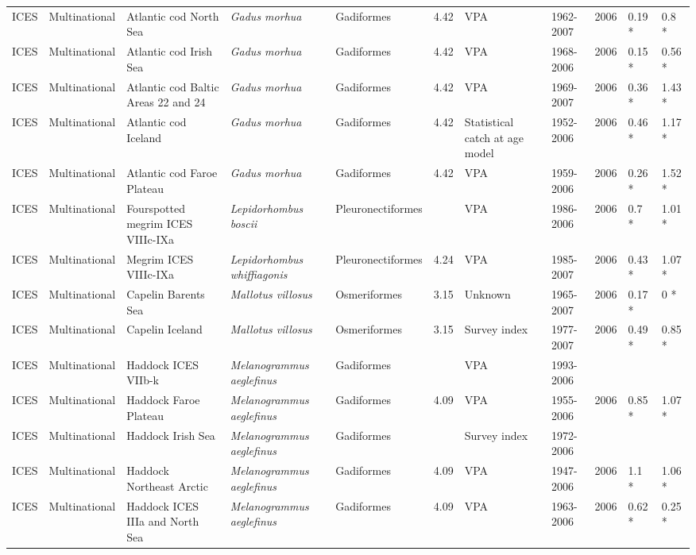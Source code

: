 \begin{longtable}{p{1.5cm}p{1.5cm}p{3cm}p{3cm}p{2.5cm}p{0.9cm}p{1.4cm}p{0.9cm}p{0.9cm}p{0.9cm}p{1cm}}
  ICES & Multinational & Atlantic cod North Sea & \textit{Gadus morhua} & Gadiformes & 4.42 & VPA & 1962-2007 & 2006 & 0.19 * & 0.8 * \\ 
  ICES & Multinational & Atlantic cod Irish Sea & \textit{Gadus morhua} & Gadiformes & 4.42 & VPA & 1968-2006 & 2006 & 0.15 * & 0.56 * \\ 
  ICES & Multinational & Atlantic cod Baltic Areas 22 and 24 & \textit{Gadus morhua} & Gadiformes & 4.42 & VPA & 1969-2007 & 2006 & 0.36 * & 1.43 * \\ 
  ICES & Multinational & Atlantic cod Iceland & \textit{Gadus morhua} & Gadiformes & 4.42 & Statistical catch at age model & 1952-2006 & 2006 & 0.46 * & 1.17 * \\ 
  ICES & Multinational & Atlantic cod Faroe Plateau & \textit{Gadus morhua} & Gadiformes & 4.42 & VPA & 1959-2006 & 2006 & 0.26 * & 1.52 * \\ 
  ICES & Multinational & Fourspotted megrim ICES VIIIc-IXa & \textit{Lepidorhombus boscii} & Pleuronectiformes &  & VPA & 1986-2006 & 2006 & 0.7 * & 1.01 * \\ 
  ICES & Multinational & Megrim ICES VIIIc-IXa & \textit{Lepidorhombus whiffiagonis} & Pleuronectiformes & 4.24 & VPA & 1985-2007 & 2006 & 0.43 * & 1.07 * \\ 
  ICES & Multinational & Capelin Barents Sea & \textit{Mallotus villosus} & Osmeriformes & 3.15 & Unknown & 1965-2007 & 2006 & 0.17 * & 0 * \\ 
  ICES & Multinational & Capelin Iceland & \textit{Mallotus villosus} & Osmeriformes & 3.15 & Survey index & 1977-2007 & 2006 & 0.49 * & 0.85 * \\ 
  ICES & Multinational & Haddock ICES VIIb-k & \textit{Melanogrammus aeglefinus} & Gadiformes &  & VPA & 1993-2006 &  &  &  \\ 
  ICES & Multinational & Haddock Faroe Plateau & \textit{Melanogrammus aeglefinus} & Gadiformes & 4.09 & VPA & 1955-2006 & 2006 & 0.85 * & 1.07 * \\ 
  ICES & Multinational & Haddock Irish Sea & \textit{Melanogrammus aeglefinus} & Gadiformes &  & Survey index & 1972-2006 &  &  &  \\ 
  ICES & Multinational & Haddock Northeast Arctic & \textit{Melanogrammus aeglefinus} & Gadiformes & 4.09 & VPA & 1947-2006 & 2006 & 1.1 * & 1.06 * \\ 
  ICES & Multinational & Haddock ICES IIIa and North Sea & \textit{Melanogrammus aeglefinus} & Gadiformes & 4.09 & VPA & 1963-2006 & 2006 & 0.62 * & 0.25 * \\ 

\end{longtable}
